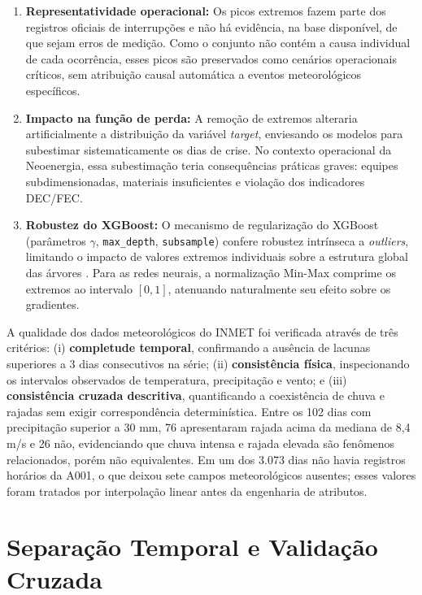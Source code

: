 \begin{enumerate}
    \item \textbf{Representatividade operacional:} Os picos extremos fazem parte dos registros oficiais de interrupções e não há evidência, na base disponível, de que sejam erros de medição. Como o conjunto não contém a causa individual de cada ocorrência, esses picos são preservados como cenários operacionais críticos, sem atribuição causal automática a eventos meteorológicos específicos.

    \item \textbf{Impacto na função de perda:} A remoção de extremos alteraria artificialmente a distribuição da variável \textit{target}, enviesando os modelos para subestimar sistematicamente os dias de crise. No contexto operacional da Neoenergia, essa subestimação teria consequências práticas graves: equipes subdimensionadas, materiais insuficientes e violação dos indicadores DEC/FEC.

    \item \textbf{Robustez do XGBoost:} O mecanismo de regularização do XGBoost (parâmetros $\gamma$, \texttt{max\_depth}, \texttt{subsample}) confere robustez intrínseca a \textit{outliers}, limitando o impacto de valores extremos individuais sobre a estrutura global das árvores \cite{chen2016xgboost}. Para as redes neurais, a normalização Min-Max comprime os extremos ao intervalo $[0, 1]$, atenuando naturalmente seu efeito sobre os gradientes.
\end{enumerate}

A qualidade dos dados meteorológicos do INMET foi verificada através de três critérios: (i) \textbf{completude temporal}, confirmando a ausência de lacunas superiores a 3 dias consecutivos na série; (ii) \textbf{consistência física}, inspecionando os intervalos observados de temperatura, precipitação e vento; e (iii) \textbf{consistência cruzada descritiva}, quantificando a coexistência de chuva e rajadas sem exigir correspondência determinística. Entre os 102 dias com precipitação superior a 30 mm, 76 apresentaram rajada acima da mediana de 8,4 m/s e 26 não, evidenciando que chuva intensa e rajada elevada são fenômenos relacionados, porém não equivalentes. Em um dos 3.073 dias não havia registros horários da A001, o que deixou sete campos meteorológicos ausentes; esses valores foram tratados por interpolação linear antes da engenharia de atributos.

\section{Separação Temporal e Validação Cruzada}\label{sec:protocolo_validacao}

